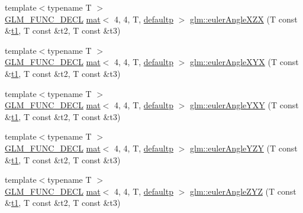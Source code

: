 \begin{DoxyCompactItemize}
\item 
{\footnotesize template$<$typename T $>$ }\\\mbox{\hyperlink{setup_8hpp_ab2d052de21a70539923e9bcbf6e83a51}{G\+L\+M\+\_\+\+F\+U\+N\+C\+\_\+\+D\+E\+CL}} \mbox{\hyperlink{structglm_1_1mat}{mat}}$<$ 4, 4, T, \mbox{\hyperlink{namespaceglm_a36ed105b07c7746804d7fdc7cc90ff25a9d21ccd8b5a009ec7eb7677befc3bf51}{defaultp}} $>$ \mbox{\hyperlink{group__gtx__euler__angles_ga60171c79a17aec85d7891ae1d1533ec9}{glm\+::euler\+Angle\+X\+ZX}} (T const \&\mbox{\hyperlink{_s_d_l__opengl__glext_8h_af48031a37b713afa3b0d0d7d29653d7c}{t1}}, T const \&t2, T const \&t3)
\item 
{\footnotesize template$<$typename T $>$ }\\\mbox{\hyperlink{setup_8hpp_ab2d052de21a70539923e9bcbf6e83a51}{G\+L\+M\+\_\+\+F\+U\+N\+C\+\_\+\+D\+E\+CL}} \mbox{\hyperlink{structglm_1_1mat}{mat}}$<$ 4, 4, T, \mbox{\hyperlink{namespaceglm_a36ed105b07c7746804d7fdc7cc90ff25a9d21ccd8b5a009ec7eb7677befc3bf51}{defaultp}} $>$ \mbox{\hyperlink{group__gtx__euler__angles_ga29bd0787a28a6648159c0d6e69706066}{glm\+::euler\+Angle\+X\+YX}} (T const \&\mbox{\hyperlink{_s_d_l__opengl__glext_8h_af48031a37b713afa3b0d0d7d29653d7c}{t1}}, T const \&t2, T const \&t3)
\item 
{\footnotesize template$<$typename T $>$ }\\\mbox{\hyperlink{setup_8hpp_ab2d052de21a70539923e9bcbf6e83a51}{G\+L\+M\+\_\+\+F\+U\+N\+C\+\_\+\+D\+E\+CL}} \mbox{\hyperlink{structglm_1_1mat}{mat}}$<$ 4, 4, T, \mbox{\hyperlink{namespaceglm_a36ed105b07c7746804d7fdc7cc90ff25a9d21ccd8b5a009ec7eb7677befc3bf51}{defaultp}} $>$ \mbox{\hyperlink{group__gtx__euler__angles_ga750fba9894117f87bcc529d7349d11de}{glm\+::euler\+Angle\+Y\+XY}} (T const \&\mbox{\hyperlink{_s_d_l__opengl__glext_8h_af48031a37b713afa3b0d0d7d29653d7c}{t1}}, T const \&t2, T const \&t3)
\item 
{\footnotesize template$<$typename T $>$ }\\\mbox{\hyperlink{setup_8hpp_ab2d052de21a70539923e9bcbf6e83a51}{G\+L\+M\+\_\+\+F\+U\+N\+C\+\_\+\+D\+E\+CL}} \mbox{\hyperlink{structglm_1_1mat}{mat}}$<$ 4, 4, T, \mbox{\hyperlink{namespaceglm_a36ed105b07c7746804d7fdc7cc90ff25a9d21ccd8b5a009ec7eb7677befc3bf51}{defaultp}} $>$ \mbox{\hyperlink{group__gtx__euler__angles_ga5e5e40abc27630749b42b3327c76d6e4}{glm\+::euler\+Angle\+Y\+ZY}} (T const \&\mbox{\hyperlink{_s_d_l__opengl__glext_8h_af48031a37b713afa3b0d0d7d29653d7c}{t1}}, T const \&t2, T const \&t3)
\item 
{\footnotesize template$<$typename T $>$ }\\\mbox{\hyperlink{setup_8hpp_ab2d052de21a70539923e9bcbf6e83a51}{G\+L\+M\+\_\+\+F\+U\+N\+C\+\_\+\+D\+E\+CL}} \mbox{\hyperlink{structglm_1_1mat}{mat}}$<$ 4, 4, T, \mbox{\hyperlink{namespaceglm_a36ed105b07c7746804d7fdc7cc90ff25a9d21ccd8b5a009ec7eb7677befc3bf51}{defaultp}} $>$ \mbox{\hyperlink{group__gtx__euler__angles_gacd795f1dbecaf74974f9c76bbcca6830}{glm\+::euler\+Angle\+Z\+YZ}} (T const \&\mbox{\hyperlink{_s_d_l__opengl__glext_8h_af48031a37b713afa3b0d0d7d29653d7c}{t1}}, T const \&t2, T const \&t3)

\end{DoxyCompactItemize}
